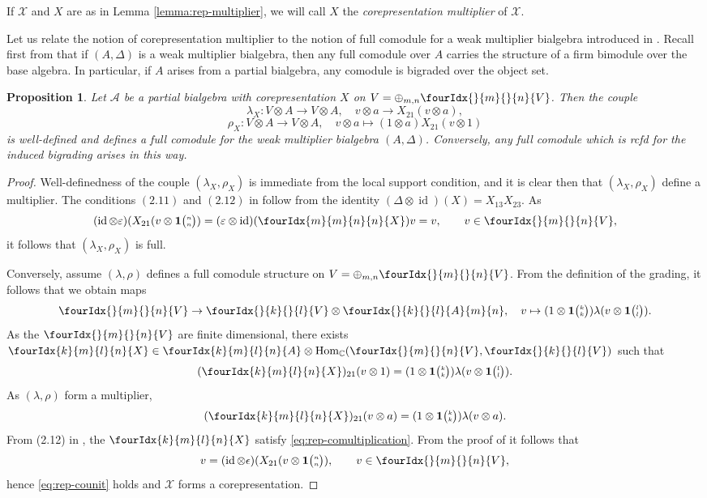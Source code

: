 \documentclass[10pt]{article}
\DeclareMathOperator{\id}{id}
\DeclareMathOperator{\Hom}{Hom}
\newcommand{\C}{\mathbb{C}}
\newcommand{\Grt}[3]{#1{\tiny {\begin{pmatrix} #2\\#3\end{pmatrix}}}}
\newcommand{\UnitC}[2]{\Grt{\mathbf{1}}{#1}{#2}}
\newcommand{\Gr}[5]{\fourIdx{#2}{#4}{#3}{#5}{#1}}%
\newcommand{\Gru}[3]{\Gr{#1}{}{}{#2}{#3}}
\newtheorem{Prop}[Theorem]{Proposition}
\theoremstyle{definition}
\numberwithin{equation}{section}
\begin{document}
If $\mathscr{X}$ and $X$ are as in Lemma \ref{lemma:rep-multiplier}, we will call $X$ the \emph{corepresentation multiplier} of $\mathscr{X}$. 

Let us relate the notion of corepresentation multiplier to the notion of full comodule for a weak multiplier bialgebra introduced in \cite[Definition 2.2 and Definition 4.2]{Boh2}. Recall first from \cite[Theorem 4.5]{Boh2} that if $(A,\Delta)$ is a weak multiplier bialgebra, then any full comodule over $A$ carries the structure of a firm bimodule over the base algebra. In particular, if $A$ arises from a partial bialgebra, any comodule is bigraded over the object set. 

\begin{Prop} Let $\mathscr{A}$ be a partial bialgebra with corepresentation $X$ on $V = \oplus_{m,n} \Gru{V}{m}{n}$. Then the couple \[\lambda_X: V\otimes A \rightarrow V\otimes A,\quad v\otimes a \rightarrow X_{21}(v\otimes a),\] \[\rho_X: V\otimes A\rightarrow V\otimes A,\quad v\otimes a \mapsto (1\otimes a)X_{21}(v\otimes 1)\] is well-defined and defines a full comodule for the weak multiplier bialgebra $(A,\Delta)$. Conversely, any full comodule which is rcfd for the induced bigrading arises in this way.
\end{Prop} 

\begin{proof} Well-definedness of the couple $(\lambda_X,\rho_X)$ is immediate from the local support condition, and it is clear then that $(\lambda_X,\rho_X)$ define a multiplier.  The conditions $(2.11)$ and $(2.12)$ in \cite[Definition 2.12]{Boh2} follow from the identity $(\Delta\otimes \id)(X) = X_{13}X_{23}$. As \[ (\id\otimes \varepsilon)(X_{21}(v\otimes \UnitC{n}{n}) = (\varepsilon\otimes \id)(\Gr{X}{m}{n}{m}{n}) v  = v, \qquad v\in \Gru{V}{m}{n},\] it follows that $(\lambda_X,\rho_X)$ is full.

 Conversely, assume $(\lambda,\rho)$ defines a full comodule structure on $V = \oplus_{m,n} \Gru{V}{m}{n}$. From the definition of the grading, it follows that we obtain maps \[\Gru{V}{m}{n}\rightarrow \Gru{V}{k}{l}\otimes \Gru{A}{k}{l}{m}{n},\quad v \mapsto (1\otimes \UnitC{k}{k})\lambda(v\otimes \UnitC{l}{l}).\] As the $\Gru{V}{m}{n}$ are finite dimensional, there exists $\Gr{X}{k}{l}{m}{n} \in \Gr{A}{k}{l}{m}{n}\otimes \Hom_{\C}(\Gru{V}{m}{n},\Gru{V}{k}{l})$ such that  
\[(\Gr{X}{k}{l}{m}{n})_{21}(v\otimes 1)=(1\otimes \UnitC{k}{k})\lambda(v\otimes \UnitC{l}{l}).\] As $(\lambda,\rho)$ form a multiplier, \[(\Gr{X}{k}{l}{m}{n})_{21}(v\otimes a) = (1\otimes \UnitC{k}{k})\lambda(v\otimes a).\] From (2.12) in \cite[Definition 2.12]{Boh2}, the $\Gr{X}{k}{l}{m}{n}$ satisfy \eqref{eq:rep-comultiplication}. From the proof of \cite[Theorem 4.5]{Boh2} it follows that \[v = (\id\otimes \epsilon)(X_{21}(v\otimes \UnitC{n}{n}),\qquad v\in \Gru{V}{m}{n},\] hence \eqref{eq:rep-counit} holds and $\mathscr{X}$ forms a corepresentation. %
\end{proof}
\end{document}
